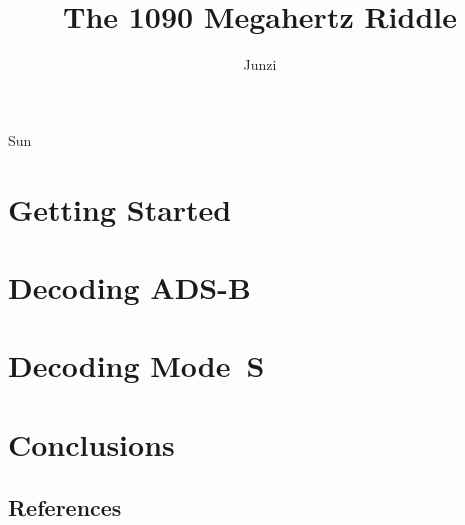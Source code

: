\documentclass[openright]{r1090}
\date{}
\begin{document}
\title[A Guide to Decoding Mode S and ADS-B Signals]{The 1090 Megahertz Riddle}
\author{Junzi}{Sun}





\dedication{
  This book is dedicated to my sons: William and Vincent
}

\setcounter{tocdepth}{1}
\tableofcontents



\part{Getting Started}



\part{Decoding ADS-B}









\part{Decoding Mode~S}










\part{Conclusions}



\chapter*{References}
\printbibliography[heading=none]




\end{document}
